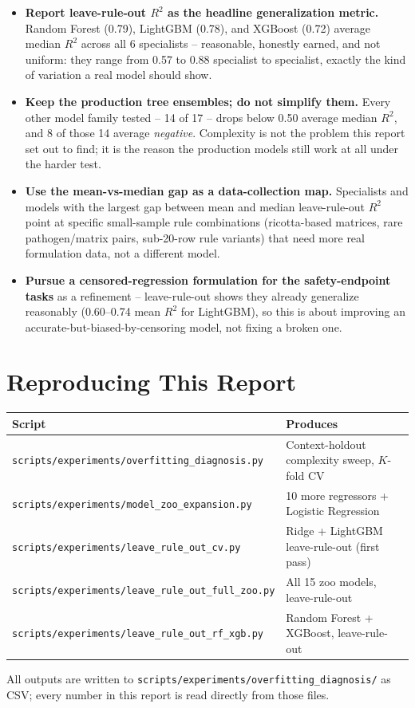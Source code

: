 \documentclass[11pt]{article}
\begin{document}
\begin{itemize}[leftmargin=1.2em,itemsep=0.3em]
  \item \textbf{Report leave-rule-out $R^2$ as the headline generalization
  metric.} Random Forest (0.79), LightGBM (0.78), and XGBoost (0.72)
  average median $R^2$ across all 6 specialists -- reasonable, honestly
  earned, and not uniform: they range from 0.57 to 0.88 specialist to
  specialist, exactly the kind of variation a real model should show.
  \item \textbf{Keep the production tree ensembles; do not simplify them.}
  Every other model family tested -- 14 of 17 -- drops below 0.50 average
  median $R^2$, and 8 of those 14 average \emph{negative}. Complexity is
  not the problem this report set out to find; it is the reason the
  production models still work at all under the harder test.
  \item \textbf{Use the mean-vs-median gap as a data-collection map.}
  Specialists and models with the largest gap between mean and median
  leave-rule-out $R^2$ point at specific small-sample rule combinations
  (ricotta-based matrices, rare pathogen/matrix pairs, sub-20-row rule
  variants) that need more real formulation data, not a different model.
  \item \textbf{Pursue a censored-regression formulation for the
  safety-endpoint tasks} as a refinement -- leave-rule-out shows they
  already generalize reasonably (0.60--0.74 mean $R^2$ for LightGBM), so
  this is about improving an accurate-but-biased-by-censoring model, not
  fixing a broken one.
\end{itemize}

\section{Reproducing This Report}
\begin{center}
\small
\begin{tabular}{ll}
\toprule
\textbf{Script} & \textbf{Produces} \\
\midrule
\texttt{scripts/experiments/overfitting\_diagnosis.py} & Context-holdout complexity sweep, $K$-fold CV \\
\texttt{scripts/experiments/model\_zoo\_expansion.py} & 10 more regressors + Logistic Regression \\
\texttt{scripts/experiments/leave\_rule\_out\_cv.py} & Ridge + LightGBM leave-rule-out (first pass) \\
\texttt{scripts/experiments/leave\_rule\_out\_full\_zoo.py} & All 15 zoo models, leave-rule-out \\
\texttt{scripts/experiments/leave\_rule\_out\_rf\_xgb.py} & Random Forest + XGBoost, leave-rule-out \\
\bottomrule
\end{tabular}
\end{center}
All outputs are written to \texttt{scripts/experiments/overfitting\_diagnosis/}
as CSV; every number in this report is read directly from those files.
\end{document}
